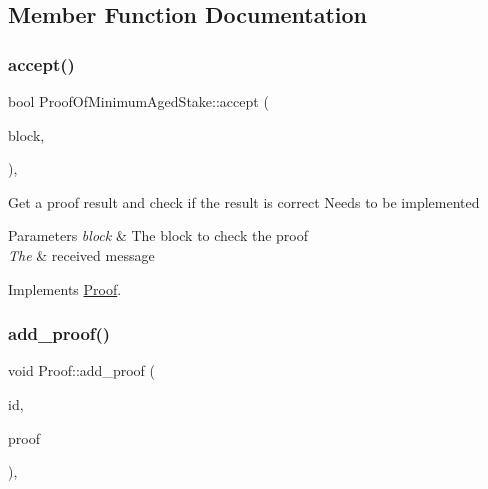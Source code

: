 \subsection{Member Function Documentation}
\mbox{\label{classProofOfMinimumAgedStake_add68213606b37c50390cf1a0dd16c17b}} 
\subsubsection{\texorpdfstring{accept()}{accept()}}
{\footnotesize\ttfamily bool Proof\+Of\+Minimum\+Aged\+Stake\+::accept (\begin{DoxyParamCaption}\item[{\mbox{\hyperlink{classBlock}{Block}} $\ast$}]{block,  }\item[{\mbox{\hyperlink{classMessage}{Message}} $\ast$}]{ }\end{DoxyParamCaption})\hspace{0.3cm}{\ttfamily [override]}, {\ttfamily [virtual]}}

Get a proof result and check if the result is correct Needs to be implemented


\begin{DoxyParams}{Parameters}
{\em block} & The block to check the proof \\
\hline
{\em The} & received message \\
\hline
\end{DoxyParams}


Implements \mbox{\hyperlink{classProof_ad52fee058ea617a186133cb6a008fe6e}{Proof}}.

\mbox{\label{classProof_a71874539fdbcc93c15594b889c95225b}} 
\subsubsection{\texorpdfstring{add\+\_\+proof()}{add\_proof()}}
{\footnotesize\ttfamily void Proof\+::add\+\_\+proof (\begin{DoxyParamCaption}\item[{int}]{id,  }\item[{std\+::function$<$ \mbox{\hyperlink{classProof}{Proof}} $\ast$()$>$}]{proof }\end{DoxyParamCaption})\hspace{0.3cm}{\ttfamily [static]}, {\ttfamily [inherited]}}

